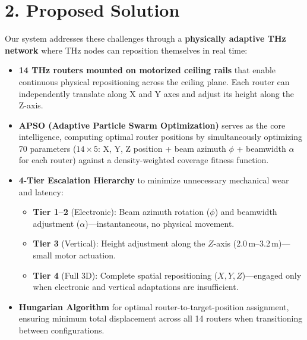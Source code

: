 \documentclass[12pt,a4paper]{article}
\begin{document}
\section{2. Proposed Solution}
Our system addresses these challenges through a \textbf{physically adaptive THz network} where THz nodes can reposition themselves in real time:
\begin{itemize}
    \item \textbf{14 THz routers mounted on motorized ceiling rails} that enable continuous physical repositioning across the ceiling plane. Each router can independently translate along X and Y axes and adjust its height along the Z-axis.
    \item \textbf{APSO (Adaptive Particle Swarm Optimization)} serves as the core intelligence, computing optimal router positions by simultaneously optimizing 70 parameters ($14 \times 5$: X, Y, Z position + beam azimuth $\phi$ + beamwidth $\alpha$ for each router) against a density-weighted coverage fitness function.
    \item \textbf{4-Tier Escalation Hierarchy} to minimize unnecessary mechanical wear and latency:
    \begin{itemize}
        \item \textbf{Tier 1--2} (Electronic): Beam azimuth rotation ($\phi$) and beamwidth adjustment ($\alpha$)---instantaneous, no physical movement.
        \item \textbf{Tier 3} (Vertical): Height adjustment along the $Z$-axis (2.0\,m--3.2\,m)---small motor actuation.
        \item \textbf{Tier 4} (Full 3D): Complete spatial repositioning ($X, Y, Z$)---engaged only when electronic and vertical adaptations are insufficient.
    \end{itemize}
    \item \textbf{Hungarian Algorithm} for optimal router-to-target-position assignment, ensuring minimum total displacement across all 14 routers when transitioning between configurations.
\end{itemize}
\end{document}
